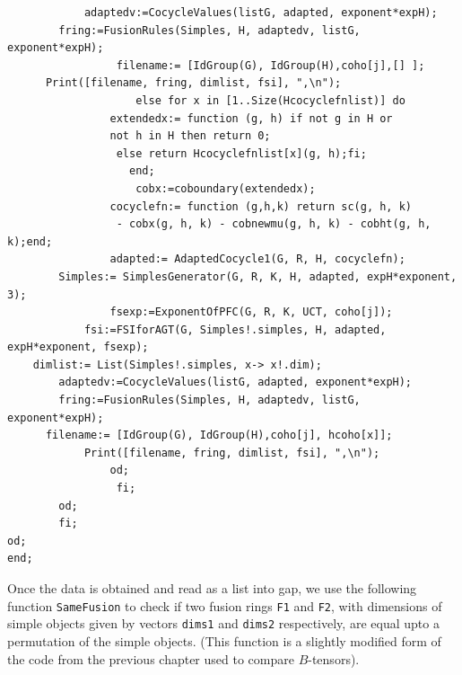 \documentclass[a4paper, 10pt]{book}
\theoremstyle{definition}
\numberwithin{equation}{chapter}
\newcommand\lstl{\lstinline}
\begin{document}
\begin{lstlisting}
	        adaptedv:=CocycleValues(listG, adapted, exponent*expH);
		fring:=FusionRules(Simples, H, adaptedv, listG, exponent*expH);
                 filename:= [IdGroup(G), IdGroup(H),coho[j],[] ];
	  Print([filename, fring, dimlist, fsi], ",\n");
                    else for x in [1..Size(Hcocyclefnlist)] do                      
                extendedx:= function (g, h) if not g in H or 
                not h in H then return 0;
                 else return Hcocyclefnlist[x](g, h);fi;
                   end;
                    cobx:=coboundary(extendedx);
          	    cocyclefn:= function (g,h,k) return sc(g, h, k) 
          	     - cobx(g, h, k) - cobnewmu(g, h, k) - cobht(g, h, k);end; 
                adapted:= AdaptedCocycle1(G, R, H, cocyclefn);
		Simples:= SimplesGenerator(G, R, K, H, adapted, expH*exponent, 3);
                fsexp:=ExponentOfPFC(G, R, K, UCT, coho[j]);
            fsi:=FSIforAGT(G, Simples!.simples, H, adapted, expH*exponent, fsexp);
	dimlist:= List(Simples!.simples, x-> x!.dim); 
        adaptedv:=CocycleValues(listG, adapted, exponent*expH);
		fring:=FusionRules(Simples, H, adaptedv, listG, exponent*expH);
	  filename:= [IdGroup(G), IdGroup(H),coho[j], hcoho[x]];
            Print([filename, fring, dimlist, fsi], ",\n");
                od;
                 fi;
       	od;
        fi;
od;
end;
\end{lstlisting}
Once the data is obtained and read as a list into gap, we use the following function \lstl{SameFusion} to check if two fusion rings \lstl{F1} and \lstl{F2}, with dimensions of simple objects given by vectors \lstl{dims1} and \lstl{dims2} respectively, are equal upto a permutation of the simple objects. (This function is a slightly modified form of the code from the previous chapter used to compare $B$-tensors).
\end{document}

